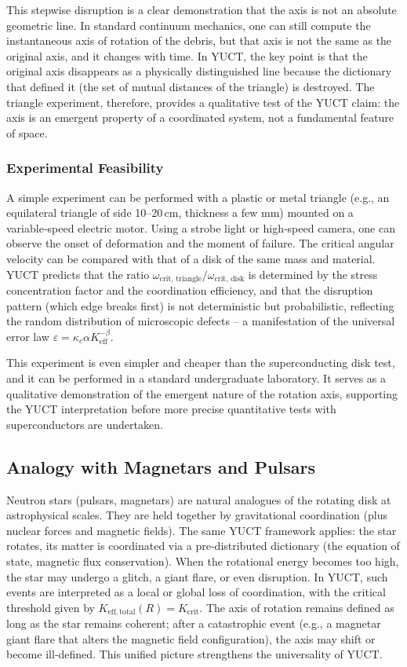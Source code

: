 \documentclass[12pt,a4paper]{article}
\newcommand{\Kefftot}{K_{\mathrm{eff,total}}}
\newcommand{\Kcrit}{K_{\mathrm{crit}}}
\begin{document}
	This stepwise disruption is a clear demonstration that the axis is not an absolute geometric line. In standard continuum mechanics, one can still compute the instantaneous axis of rotation of the debris, but that axis is not the same as the original axis, and it changes with time. In YUCT, the key point is that the original axis disappears as a physically distinguished line because the dictionary that defined it (the set of mutual distances of the triangle) is destroyed. The triangle experiment, therefore, provides a qualitative test of the YUCT claim: the axis is an emergent property of a coordinated system, not a fundamental feature of space.
	
	\subsubsection{Experimental Feasibility}
	
	A simple experiment can be performed with a plastic or metal triangle (e.g., an equilateral triangle of side 10–20 cm, thickness a few mm) mounted on a variable‑speed electric motor. Using a strobe light or high‑speed camera, one can observe the onset of deformation and the moment of failure. The critical angular velocity can be compared with that of a disk of the same mass and material. YUCT predicts that the ratio \(\omega_{\text{crit, triangle}} / \omega_{\text{crit, disk}}\) is determined by the stress concentration factor and the coordination efficiency, and that the disruption pattern (which edge breaks first) is not deterministic but probabilistic, reflecting the random distribution of microscopic defects – a manifestation of the universal error law \(\varepsilon = \kappa_c \alpha K_{\mathrm{eff}}^{-\beta}\).
	
	This experiment is even simpler and cheaper than the superconducting disk test, and it can be performed in a standard undergraduate laboratory. It serves as a qualitative demonstration of the emergent nature of the rotation axis, supporting the YUCT interpretation before more precise quantitative tests with superconductors are undertaken.
	
	\subsection{Analogy with Magnetars and Pulsars}
	
	Neutron stars (pulsars, magnetars) are natural analogues of the rotating disk at astrophysical scales. They are held together by gravitational coordination (plus nuclear forces and magnetic fields). The same YUCT framework applies: the star rotates, its matter is coordinated via a pre‑distributed dictionary (the equation of state, magnetic flux conservation). When the rotational energy becomes too high, the star may undergo a glitch, a giant flare, or even disruption. In YUCT, such events are interpreted as a local or global loss of coordination, with the critical threshold given by \(\Kefftot(R) = \Kcrit\). The axis of rotation remains defined as long as the star remains coherent; after a catastrophic event (e.g., a magnetar giant flare that alters the magnetic field configuration), the axis may shift or become ill‑defined. This unified picture strengthens the universality of YUCT.
	
\end{document}
